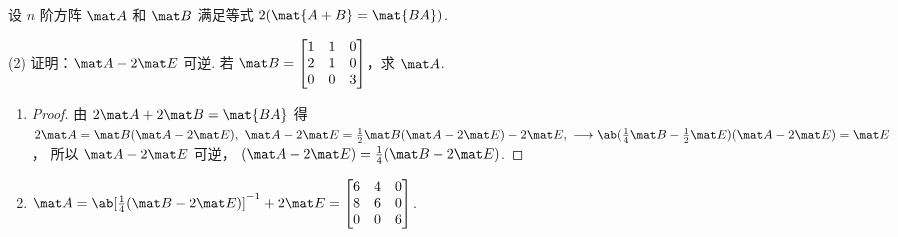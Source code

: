 \begin{problem}[本题8分]
  设 $n$ 阶方阵 $\mat A$ 和 $\mat B$ 满足等式 $2(\mat{A + B} = \mat{BA})$.
  \begin{tasks}[ label = \arabic*. ](2)
    \task 证明：$\mat A - 2\mat E$ 可逆.
    \task 若 $\mat B =
    \begin{bmatrix}
      1 & 1 & 0\\
      2 & 1 & 0\\
      0 & 0 & 3
    \end{bmatrix}$，求 $\mat A$.
  \end{tasks}
\end{problem}
\scratch[2ex]
\begin{solution}\leavevmode
  \begin{enumerate}
    \item \begin{proof}
      由 $2\mat A + 2\mat B = \mat{BA}$ 得
      $ 2\mat A = \mat B(\mat A - 2\mat E),~
        \mat A - 2\mat E = \frac12\mat B(\mat A - 2\mat E) - 2\mat E,~
        \longrightarrow
        \ab(\frac14\mat B- \frac12\mat E)(\mat A - 2\mat E) = \mat E$，
      所以 $\mat A - 2\mat E$ 可逆，
      $(\mat A - 2\mat E) = \frac14(\mat B - 2\mat E)$.
    \end{proof}
    \item $
      \mat A = \ab[\frac14(\mat B - 2\mat E)]^{-1} + 2\mat E =
    \begin{bmatrix}
      6 & 4 & 0\\
      8 & 6 & 0\\
      0 & 0 & 6
    \end{bmatrix}$.
  \end{enumerate}
\end{solution}